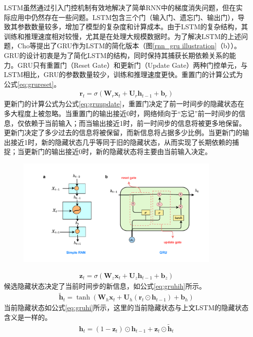 LSTM虽然通过引入门控机制有效地解决了简单RNN中的梯度消失问题，但在实际应用中仍然存在一些问题。LSTM包含三个门（输入门、遗忘门、输出门），导致其参数数量较多，增加了模型的复杂度和计算成本。由于LSTM的复杂结构，其训练和推理速度相对较慢，尤其是在处理大规模数据时。为了解决LSTM的上述问题，Cho等提出了GRU作为LSTM的简化版本\cite{choLearningPhraseRepresentations2014}（图\ref{rnn_gru illustration}（b））。GRU的设计初衷是为了简化LSTM的结构，同时保持其捕获长期依赖关系的能力。GRU只有重置门（Reset Gate）和更新门（Update Gate）两种门控单元，与LSTM相比，GRU的参数数量较少，训练和推理速度更快。重置门的计算公式为公式\eqref{eq:grureset}。
\begin{align}
  \mathbf{r}_t = \sigma(\mathbf{W}_r \mathbf{x}_t + \mathbf{U}_r \mathbf{h}_{t-1} + \mathbf{b}_r) \label{eq:grureset}
\end{align}
更新门的计算公式为公式\eqref{eq:gruupdate}，重置门决定了前一时间步的隐藏状态在多大程度上被忽略。当重置门的输出接近0时，网络倾向于“忘记”前一时间步的信息，仅依赖于当前输入；而当输出接近1时，前一时间步的信息将被更多地保留。
更新门决定了多少过去的信息将被保留，而新信息将占据多少比例。当更新门的输出接近1时，新的隐藏状态几乎等同于旧的隐藏状态，从而实现了长期依赖的捕捉；当更新门的输出接近0时，新的隐藏状态将主要由当前输入决定。
\begin{figure}[htbp]
  \centering
  \includegraphics[width=0.9\textwidth]{Fig/rnn-gru.pdf}
\end{figure}
\begin{align}
  \mathbf{z}_t = \sigma(\mathbf{W}_z \mathbf{x}_t + \mathbf{U}_z \mathbf{h}_{t-1} + \mathbf{b}_z) \label{eq:gruupdate}
\end{align}
候选隐藏状态决定了当前时间步的新信息，如公式\eqref{eq:gruhih}所示。
\begin{align}
  \tilde{\mathbf{h}}_t = \tanh(\mathbf{W}_h \mathbf{x}_t + \mathbf{U}_h (\mathbf{r}_t \odot \mathbf{h}_{t-1}) + \mathbf{b}_h) \label{eq:gruhih}
\end{align}
当前隐藏状态如公式\eqref{eq:gruhi}所示，这里的当前隐藏状态与上文LSTM的隐藏状态含义是一样的。
\begin{align}
  \mathbf{h}_t = (1 - \mathbf{z}_t) \odot \mathbf{h}_{t-1} + \mathbf{z}_t \odot \tilde{\mathbf{h}}_t \label{eq:gruhi}
\end{align}

